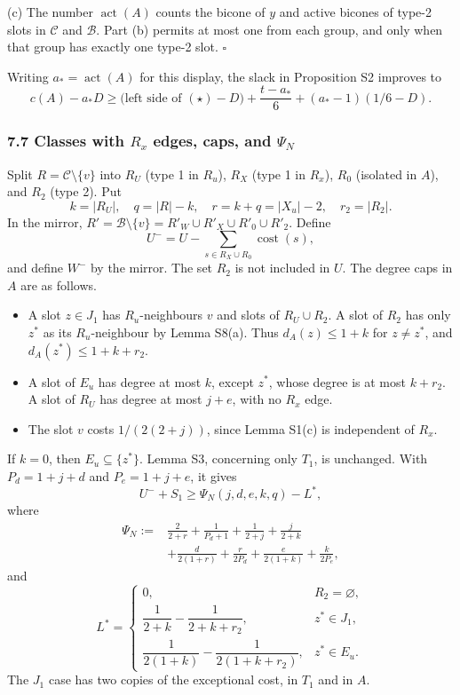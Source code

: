 (c) The number $\operatorname{act}(A)$ counts the bicone of $y$ and active bicones of type-2 slots in $\mathcal C$ and $\mathcal B$. Part (b) permits at most one from each group, and only when that group has exactly one type-2 slot. \hfill$\square$

Writing $a_* = \operatorname{act}(A)$ for this display, the slack in Proposition S2 improves to
\[
 c(A)-a_*D\ge\bigl(\text{left side of }(\star)-D\bigr)
       +\frac{t-a_*}{6}+(a_*-1)(1/6-D).
\]

\subsubsection*{7.7 Classes with $R_x$ edges, caps, and $\Psi_N$}
Split $R=\mathcal C\setminus\{v\}$ into $R_U$ (type 1 in $R_u$), $R_X$ (type 1 in $R_x$), $R_0$ (isolated in $A$), and $R_2$ (type 2). Put
\[
 k=|R_U|,\quad q=|R|-k,\quad r=k+q=|X_u|-2,\quad r_2=|R_2|.
\]
In the mirror, $R'=\mathcal B\setminus\{v\}=R'_W\cup R'_X\cup R'_0\cup R'_2$. Define
\[
 U^-=U-\sum_{s\in R_X\cup R_0}\operatorname{cost}(s),
\]
and define $W^-$ by the mirror. The set $R_2$ is not included in $U$.
The degree caps in $A$ are as follows.
\begin{itemize}
\item A slot $z\in J_1$ has $R_u$-neighbours $v$ and slots of $R_U\cup R_2$. A slot of $R_2$ has only $z^*$ as its $R_u$-neighbour by Lemma S8(a). Thus $d_A(z)\le1+k$ for $z\ne z^*$, and $d_A(z^*)\le1+k+r_2$.
\item A slot of $E_u$ has degree at most $k$, except $z^*$, whose degree is at most $k+r_2$. A slot of $R_U$ has degree at most $j+e$, with no $R_x$ edge.
\item The slot $v$ costs $1/(2(2+j))$, since Lemma S1(c) is independent of $R_x$.
\end{itemize}
If $k=0$, then $E_u\subseteq\{z^*\}$. Lemma S3, concerning only $T_1$, is unchanged. With $P_d=1+j+d$ and $P_e=1+j+e$, it gives
\[
 U^-+S_1\ge\Psi_N(j,d,e,k,q)-L^*,
\]
where
\[
\begin{aligned}
 \Psi_N:={}&\frac2{2+r}+\frac1{P_d+1}+\frac1{2+j}+\frac j{2+k}\\
 &+\frac d{2(1+r)}+\frac r{2P_d}+\frac e{2(1+k)}+\frac k{2P_e},
\end{aligned}
\]
and
\[
 L^*=\begin{cases}
 0,&R_2=\varnothing,\\
 \dfrac1{2+k}-\dfrac1{2+k+r_2},&z^*\in J_1,\\[3pt]
 \dfrac1{2(1+k)}-\dfrac1{2(1+k+r_2)},&z^*\in E_u.
 \end{cases}
\]
The $J_1$ case has two copies of the exceptional cost, in $T_1$ and in $A$.

